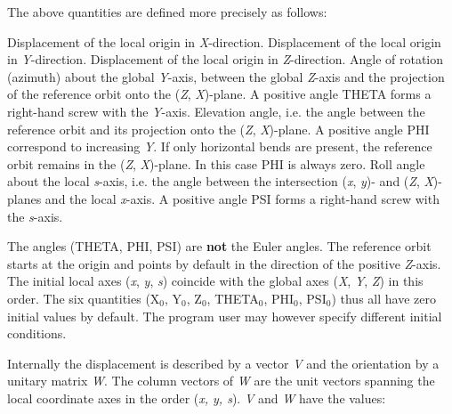 The above quantities are defined more precisely as follows:  
\begin{madlist}
    Displacement of the local origin in \textit{X}-direction. 
    Displacement of the local origin in \textit{Y}-direction. 
    Displacement of the local origin in \textit{Z}-direction. 
    Angle of rotation (azimuth) about the
     global \textit{Y}-axis, between the global \textit{Z}-axis and the
     projection of the reference orbit onto the (\textit{Z},
     \textit{X})-plane. A positive angle THETA forms a right-hand screw
     with the \textit{Y}-axis. 
    Elevation angle, i.e. the angle between the
     reference orbit and its projection onto the (\textit{Z},
     \textit{X})-plane. A positive angle PHI correspond to increasing
     \textit{Y}. If only horizontal bends are present, the reference
     orbit remains in the (\textit{Z}, \textit{X})-plane. In this case
     PHI is always zero. 
    Roll angle about the local \textit{s}-axis,
     i.e. the angle between the intersection (\textit{x}, \textit{y})-
     and (\textit{Z}, \textit{X})-planes and the local
     \textit{x}-axis. A positive angle PSI forms a right-hand screw with
     the \textit{s}-axis. 
\end{madlist} 

The angles (THETA, PHI, PSI) are \textbf{not} the Euler angles. The
reference orbit starts at the origin and points by default in the
direction of the positive \textit{Z}-axis. The initial local axes
(\textit{x}, \textit{y}, \textit{s})  coincide with the global axes
(\textit{X}, \textit{Y}, \textit{Z}) in this order. The six quantities
(X$_0$, Y$_0$, Z$_0$, THETA$_0$, PHI$_0$, PSI$_0$) thus all have zero
initial values by default. The program user may however specify
different initial conditions.  

Internally the displacement is described by a vector \textit{V} and the
orientation by a unitary matrix \textit{W}. The column vectors of
\textit{W} are the unit vectors spanning  the local coordinate axes in
the order (\textit{x, y, s}). \textit{V} and \textit{W} have the values:  

